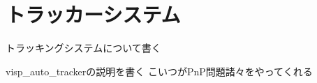 \section{トラッカーシステム}
\label{proposed_tracker}
トラッキングシステムについて書く

visp\_auto\_trackerの説明を書く
こいつがPnP問題諸々をやってくれる
